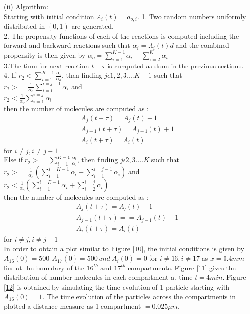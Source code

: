 \documentclass[10 pt]{article}
\begin{document}
\begin{multicols}{2}
\begin{flushleft}
(ii) Algorithm:\\
Starting with initial condition $A_i(t) = a_{o,i}$.
1. Two random numbers uniformly distributed in $(0,1)$ are generated.\\
2. The propensity functions of each of the reactions is computed including the forward and backward reactions such that $\alpha_i = A_i(t)d$ and the combined propensity is then given by $\alpha_o = \displaystyle\sum_{i=1}^{K-1}\alpha_i + \displaystyle\sum_{i=2}^{K}\alpha_i$\\
3.The time for next reaction $t + \tau$ is computed as done in the previous sections.\\
4. If $r_2 < \displaystyle\sum_{i=1}^{K-1} \frac{\alpha_i}{\alpha_o}$, then finding $j \epsilon {1,2,3....K-1}$ such that\\
$r_2 >= \frac{1}{\alpha_o}\displaystyle\sum_ {i=1}^{i=j-1} \alpha_i$ and \\
$r_2 < \frac{1}{\alpha_o}\displaystyle\sum_{i=1}^{i=j} \alpha_i$\\
then the number of molecules are computed as :\\
\begin{align}
A_j(t+\tau) = A_j(t) - 1\\
A_{j+1}(t+\tau) = A_{j+1}(t) + 1\\
A_i(t+\tau) = A_i(t)\end{align} for $i\not=j, i\not=j+1$\\
Else if $r_2 >=\displaystyle\sum_{i=1}^{K-1}\frac{\alpha_i}{\alpha_o}$, then finding $j \epsilon {2,3....K}$ such that\\
$r_2 >= \frac{1}{\alpha_o}(\displaystyle\sum_{i=1}^{i=K-1} \alpha_i + \displaystyle\sum_{i=1}^{i=j-1} \alpha_i)$ and \\
$r_2 < \frac{1}{\alpha_o}(\displaystyle\sum_{i=1}^{i=K-1} \alpha_i + \displaystyle\sum_{i=2}^{i=j} \alpha_i)$\\
then the number of molecules are computed as :\\
\begin{align}
A_j(t+\tau) = A_j(t) - 1\\
A_{j-1}(t + \tau) = = A_{j-1}(t) + 1\\
A_i(t+\tau) = A_i(t) \end{align} for $i\not=j, i\not=j-1$\\
In order to obtain a plot similar to Figure \ref{10}, the initial conditions is given by $A_{16}(0) = 500 , A_{17}(0) = 500 \: and \: A_i(0)=0 $ for $i\not=16, i\not=17$ as $x= 0.4 mm$ lies at the boundary of the $16^{th}$ and $17^{th}$ compartments. Figure \ref{11} gives the distribution of number molecules in each compartment at time $t = 4 min$. Figure \ref{12} is obtained by simulating the time evolution of 1 particle starting with $A_{16}(0) = 1$. The time evolution of the particles across the compartments in plotted a distance measure as 1 compartment $= 0.025 \mu m$.
\end{flushleft}


\end{multicols}
\end{document}
